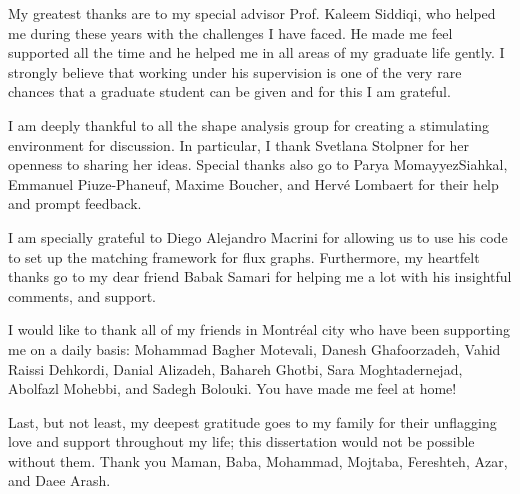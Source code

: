 My greatest thanks are to my special advisor Prof. Kaleem Siddiqi, who helped me during these years with the challenges I have faced. He made me feel supported all the time and he helped me in all areas of my graduate life gently. I strongly believe that working under his supervision is one of the very rare chances that a graduate student can be given and for this I am grateful.

I am deeply thankful to all the shape analysis group for creating a stimulating environment for discussion. In particular, I thank Svetlana Stolpner for her openness to sharing her ideas. Special thanks also go to Parya MomayyezSiahkal, Emmanuel Piuze-Phaneuf, Maxime Boucher, and Herv\'{e} Lombaert for their help and prompt feedback. 

I am specially grateful to Diego Alejandro Macrini for allowing us to use his code to set up the matching framework for flux graphs. Furthermore, my heartfelt thanks go to my dear friend Babak Samari for helping me a lot with his insightful comments, and support.  


I would like to thank all of my friends in Montr\'{e}al city who have been supporting me on a daily basis: Mohammad Bagher Motevali, Danesh Ghafoorzadeh, Vahid Raissi Dehkordi, Danial Alizadeh, Bahareh Ghotbi, Sara Moghtadernejad, Abolfazl Mohebbi, and Sadegh Bolouki. You have made me feel at home!

Last, but not least, my deepest gratitude goes to my family for their unflagging love and support throughout my life; this dissertation would not be possible without them.  Thank you Maman, Baba, Mohammad, Mojtaba, Fereshteh, Azar, and Daee Arash. 


